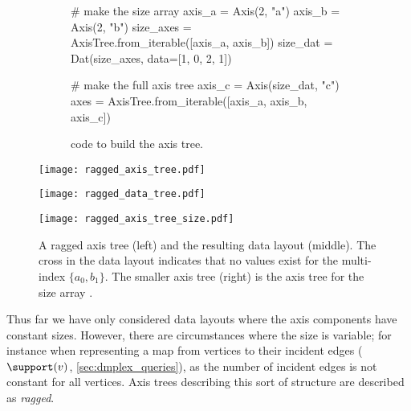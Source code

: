 \documentclass[thesis]{subfiles}
\begin{document}
\begin{figure}
  \centering
  \begin{subfigure}{.9\textwidth}
    \begin{pyalg2}
      # make the size array
      axis_a = Axis(2, "a")
      axis_b = Axis(2, "b")
      size_axes = AxisTree.from_iterable([axis_a, axis_b])
      size_dat = Dat(size_axes, data=[1, 0, 2, 1])

      # make the full axis tree
      axis_c = Axis(size_dat, "c")
      axes = AxisTree.from_iterable([axis_a, axis_b, axis_c])
    \end{pyalg2}
    \caption{ code to build the axis tree.}
  \end{subfigure}

  \vspace{1em}

  \begin{minipage}{.35\textwidth}
    \begin{center}
      \texttt{[image: ragged\_axis\_tree.pdf]}
    \end{center}
  \end{minipage}
  \begin{minipage}{.4\textwidth}
    \begin{center}
      \texttt{[image: ragged\_data\_tree.pdf]}
    \end{center}
  \end{minipage}
  \begin{minipage}{.2\textwidth}
    \begin{center}
      \texttt{[image: ragged\_axis\_tree\_size.pdf]}
    \end{center}
  \end{minipage}
  \caption{
    A ragged axis tree (left) and the resulting data layout (middle).
    The cross in the data layout indicates that no values exist for the multi-index $\{a_0, b_1\}$.
    The smaller axis tree (right) is the axis tree for the size array \pycode{[[1,0],[2,1]][?$i_a$?,?$i_b$?]}.
  }
  \label{fig:ragged_axis_tree}
\end{figure}

Thus far we have only considered data layouts where the axis components have constant sizes.
However, there are circumstances where the size is variable; for instance when representing a map from vertices to their incident edges ($\support(v)$, \cref{sec:dmplex_queries}), as the number of incident edges is not constant for all vertices.
Axis trees describing this sort of structure are described as \emph{ragged}.
\end{document}
